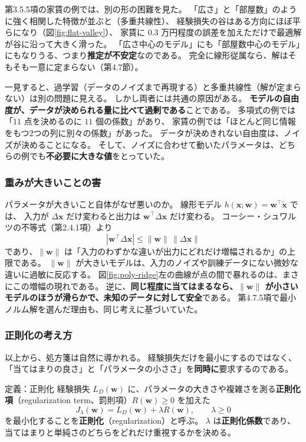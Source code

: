 第3.5.5項の家賃の例では、別の形の困難を見た。
「広さ」と「部屋数」のように強く相関した特徴が並ぶと（多重共線性）、
経験損失の谷はある方向にほぼ平らになり（図\ref{fig:flat-valley}）、
家賃に $0.3$ 万円程度の誤差を加えただけで最適解が谷に沿って大きく滑った。
「広さ中心のモデル」にも「部屋数中心のモデル」にもなりうる、つまり\textbf{推定が不安定}なのである。
完全に線形従属なら、解はそもそも一意に定まらない（第4.7節）。

一見すると、過学習（データのノイズまで再現する）と多重共線性（解が定まらない）は別の問題に見える。
しかし両者には共通の原因がある。
\textbf{モデルの自由度が、データが決められる量に比べて過剰である}ことである。
多項式の例では「$11$ 点を決めるのに $11$ 個の係数」があり、
家賃の例では「ほとんど同じ情報をもつ2つの列に別々の係数」があった。
データが決めきれない自由度は、ノイズが決めることになる。
そして、ノイズに合わせて動いたパラメータは、どちらの例でも\textbf{不必要に大きな値}をとっていた。

\subsubsection{重みが大きいことの害}

パラメータが大きいこと自体がなぜ悪いのか。
線形モデル $h(\bm{x}; \bm{w}) = \bm{w}^\top\tilde{\bm{x}}$ では、
入力が $\Delta\bm{x}$ だけ変わると出力は $\bm{w}^\top\Delta\bm{x}$ だけ変わる。
コーシー・シュワルツの不等式（第2.4.1項）より
\begin{equation}
  |\bm{w}^\top\Delta\bm{x}| \leq \|\bm{w}\|\,\|\Delta\bm{x}\|
  \label{eq:reg-lipschitz}
\end{equation}
であり、$\|\bm{w}\|$ は「入力のわずかな違いが出力にどれだけ増幅されるか」の上限である。
$\|\bm{w}\|$ が大きいモデルは、入力のノイズや訓練データにない微妙な違いに過敏に反応する。
図\ref{fig:poly-ridge}左の曲線が点の間で暴れるのは、まさにこの増幅の現れである。
逆に、\textbf{同じ程度に当てはまるなら、$\|\bm{w}\|$ が小さいモデルのほうが滑らかで、未知のデータに対して安全}である。
第4.7.5項で最小ノルム解を選んだ理由も、同じ考えに基づいていた。

\subsubsection{正則化の考え方}

以上から、処方箋は自然に導かれる。
経験損失だけを最小にするのではなく、
「当てはまりの良さ」と「パラメータの小ささ」を\textbf{同時に}要求するのである。

\begin{itembox}[l]{定義：正則化}
経験損失 $L_D(\bm{w})$ に、パラメータの大きさや複雑さを測る\textbf{正則化項}（regularization term、罰則項）$R(\bm{w}) \geq 0$ を加えた
\begin{equation}
  J_\lambda(\bm{w}) = L_D(\bm{w}) + \lambda R(\bm{w}), \qquad \lambda \geq 0
  \label{eq:reg-general}
\end{equation}
を最小化することを\textbf{正則化}（regularization）と呼ぶ。
$\lambda$ は\textbf{正則化係数}であり、当てはまりと単純さのどちらをどれだけ重視するかを決める。
\end{itembox}


